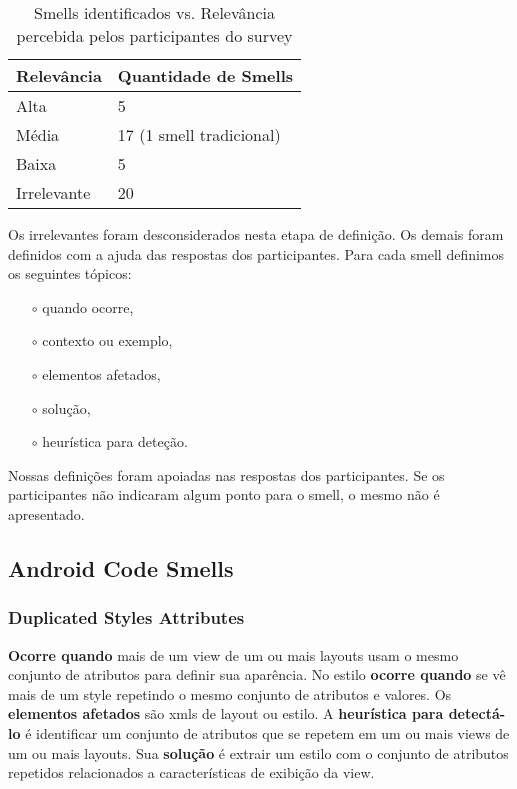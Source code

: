 \begin{table}[h]
\centering
\caption{Smells identificados vs. Relev\^ancia percebida pelos participantes do survey}
\begin{tabular}{p{3cm}|p{4cm}}
\textbf{Relev\^ancia} & \textbf{Quantidade de Smells} \\
\hline
Alta  			& 5 \\
M\'edia 		& 17 (1 smell tradicional) \\
Baixa			& 5 \\
Irrelevante 	& 20 \\
\end{tabular}
\label{tab:DadosDemograficos}
\end{table}

Os irrelevantes foram desconsiderados nesta etapa de defini\c{c}\~ao. Os demais foram definidos com a ajuda das respostas dos participantes. Para cada smell definimos os seguintes t\'opicos: 

\begin{itemize} 
	\item[$\circ$] quando ocorre, 
	\item[$\circ$] contexto ou exemplo, 
	\item[$\circ$] elementos afetados, 
	\item[$\circ$] solu\c{c}\~ao, 
	\item[$\circ$] heur\'istica para dete\c{c}\~ao.
\end{itemize}

Nossas defini\c{c}\~oes foram apoiadas nas respostas dos participantes. Se os participantes n\~ao indicaram algum ponto para o smell, o mesmo n\~ao \'e apresentado.


\subsection{Android Code Smells}
\label{sub:Android-code-smells}

\subsubsection{Duplicated Styles Attributes}

\textbf{Ocorre quando} mais de um view de um ou mais layouts usam o mesmo conjunto de atributos para definir sua aparência. No estilo \textbf{ocorre quando} se vê mais de um style repetindo o mesmo conjunto de atributos e valores. Os \textbf{elementos afetados} s\~ao xmls de layout ou estilo. A \textbf{heur\'istica para detect\'a-lo} \'e identificar um conjunto de atributos que se repetem em um ou mais views de um ou mais layouts. Sua \textbf{solu\c{c}\~ao} \'e extrair um estilo com o conjunto de atributos repetidos relacionados a caracter\'isticas de exibi\c{c}\~ao da view. 


